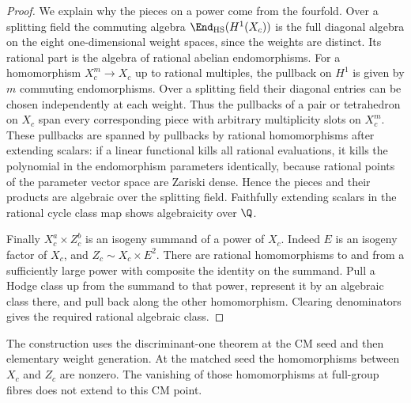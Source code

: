 \begin{proof}
We explain why the pieces on a power come from the fourfold. Over a splitting field the commuting algebra \(\End_{\mathrm{HS}}(H^1(X_c))\) is the full diagonal algebra on the eight one-dimensional weight spaces, since the weights are distinct. Its rational part is the algebra of rational abelian endomorphisms. For a homomorphism \(X_c^m\to X_c\) up to rational multiples, the pullback on \(H^1\) is given by \(m\) commuting endomorphisms. Over a splitting field their diagonal entries can be chosen independently at each weight. Thus the pullbacks of a pair or tetrahedron on \(X_c\) span every corresponding piece with arbitrary multiplicity slots on \(X_c^m\). These pullbacks are spanned by pullbacks by rational homomorphisms after extending scalars: if a linear functional kills all rational evaluations, it kills the polynomial in the endomorphism parameters identically, because rational points of the parameter vector space are Zariski dense. Hence the pieces and their products are algebraic over the splitting field. Faithfully extending scalars in the rational cycle class map shows algebraicity over \(\Q\).

Finally \(X_c^a\times Z_c^b\) is an isogeny summand of a power of \(X_c\). Indeed \(E\) is an isogeny factor of \(X_c\), and \(Z_c\sim X_c\times E^2\). There are rational homomorphisms to and from a sufficiently large power with composite the identity on the summand. Pull a Hodge class up from the summand to that power, represent it by an algebraic class there, and pull back along the other homomorphism. Clearing denominators gives the required rational algebraic class.
\end{proof}

\begin{remark}
The construction uses the discriminant-one theorem at the CM seed and then elementary weight generation. At the matched seed the homomorphisms between \(X_c\) and \(Z_c\) are nonzero. The vanishing of those homomorphisms at full-group fibres does not extend to this CM point.
\end{remark}
